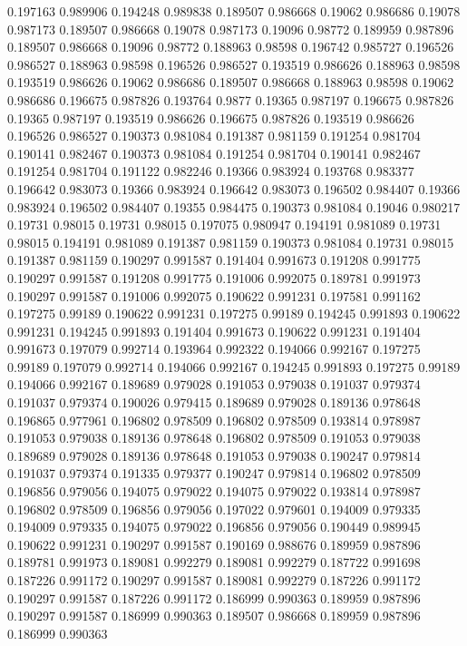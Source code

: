 0.197163 0.989906
0.194248 0.989838
0.189507 0.986668
0.19062 0.986686
0.19078 0.987173
0.189507 0.986668
0.19078 0.987173
0.19096 0.98772
0.189959 0.987896
0.189507 0.986668
0.19096 0.98772
0.188963 0.98598
0.196742 0.985727
0.196526 0.986527
0.188963 0.98598
0.196526 0.986527
0.193519 0.986626
0.188963 0.98598
0.193519 0.986626
0.19062 0.986686
0.189507 0.986668
0.188963 0.98598
0.19062 0.986686
0.196675 0.987826
0.193764 0.9877
0.19365 0.987197
0.196675 0.987826
0.19365 0.987197
0.193519 0.986626
0.196675 0.987826
0.193519 0.986626
0.196526 0.986527
0.190373 0.981084
0.191387 0.981159
0.191254 0.981704
0.190141 0.982467
0.190373 0.981084
0.191254 0.981704
0.190141 0.982467
0.191254 0.981704
0.191122 0.982246
0.19366 0.983924
0.193768 0.983377
0.196642 0.983073
0.19366 0.983924
0.196642 0.983073
0.196502 0.984407
0.19366 0.983924
0.196502 0.984407
0.19355 0.984475
0.190373 0.981084
0.19046 0.980217
0.19731 0.98015
0.19731 0.98015
0.197075 0.980947
0.194191 0.981089
0.19731 0.98015
0.194191 0.981089
0.191387 0.981159
0.190373 0.981084
0.19731 0.98015
0.191387 0.981159
0.190297 0.991587
0.191404 0.991673
0.191208 0.991775
0.190297 0.991587
0.191208 0.991775
0.191006 0.992075
0.189781 0.991973
0.190297 0.991587
0.191006 0.992075
0.190622 0.991231
0.197581 0.991162
0.197275 0.99189
0.190622 0.991231
0.197275 0.99189
0.194245 0.991893
0.190622 0.991231
0.194245 0.991893
0.191404 0.991673
0.190622 0.991231
0.191404 0.991673
0.197079 0.992714
0.193964 0.992322
0.194066 0.992167
0.197275 0.99189
0.197079 0.992714
0.194066 0.992167
0.194245 0.991893
0.197275 0.99189
0.194066 0.992167
0.189689 0.979028
0.191053 0.979038
0.191037 0.979374
0.191037 0.979374
0.190026 0.979415
0.189689 0.979028
0.189136 0.978648
0.196865 0.977961
0.196802 0.978509
0.196802 0.978509
0.193814 0.978987
0.191053 0.979038
0.189136 0.978648
0.196802 0.978509
0.191053 0.979038
0.189689 0.979028
0.189136 0.978648
0.191053 0.979038
0.190247 0.979814
0.191037 0.979374
0.191335 0.979377
0.190247 0.979814
0.196802 0.978509
0.196856 0.979056
0.194075 0.979022
0.194075 0.979022
0.193814 0.978987
0.196802 0.978509
0.196856 0.979056
0.197022 0.979601
0.194009 0.979335
0.194009 0.979335
0.194075 0.979022
0.196856 0.979056
0.190449 0.989945
0.190622 0.991231
0.190297 0.991587
0.190169 0.988676
0.189959 0.987896
0.189781 0.991973
0.189081 0.992279
0.189081 0.992279
0.187722 0.991698
0.187226 0.991172
0.190297 0.991587
0.189081 0.992279
0.187226 0.991172
0.190297 0.991587
0.187226 0.991172
0.186999 0.990363
0.189959 0.987896
0.190297 0.991587
0.186999 0.990363
0.189507 0.986668
0.189959 0.987896
0.186999 0.990363

